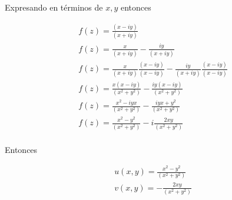 \begin{enumerate}
    Expresando en términos de $x,y$ entonces 

    \begin{gather*}
        f(z) = \frac{(x-iy)}{(x+iy)}\\
        f(z) = \frac{x}{(x+iy)} - \frac{iy}{(x+iy)} \\
        f(z) = \frac{x}{(x+iy)}\frac{(x-iy)}{(x-iy)} - \frac{iy}{(x+iy)}\frac{(x-iy)}{(x-iy)} \\
        f(z) = \frac{x(x-iy)}{(x^2 + y^2)} - \frac{iy(x-iy)}{(x^2+y^2)} \\
        f(z) = \frac{x^2-iyx}{(x^2 + y^2)} - \frac{iyx + y^2}{(x^2+y^2)} \\
        f(z) = \frac{x^2-y^2}{(x^2 + y^2)} - i\frac{2xy}{(x^2+y^2)} \\
    \end{gather*}

    Entonces

    \begin{mdframed}
        \vspace{-0.25cm}
        \begin{gather}
            u(x,y) = \frac{x^2-y^2}{(x^2 + y^2)}\\
            v(x,y) = - \frac{2xy}{(x^2+y^2)}
        \end{gather}
        \vspace{-0.3cm}
    \end{mdframed}
    
\end{enumerate}